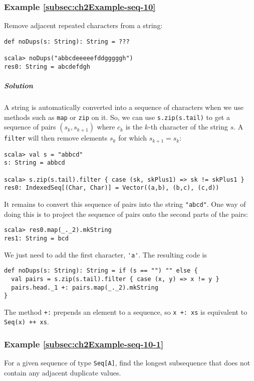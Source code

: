 \subsubsection{Example \label{subsec:ch2Example-seq-10}\ref{subsec:ch2Example-seq-10}}

Remove adjacent repeated characters from a string:
\begin{lstlisting}
def noDups(s: String): String = ???

scala> noDups("abbcdeeeeefddgggggh")
res0: String = abcdefdgh
\end{lstlisting}


\subparagraph{Solution}

A string is automatically converted into a sequence of characters
when we use methods such as \lstinline!map! or \lstinline!zip! on
it. So, we can use \lstinline!s.zip(s.tail)! to get a sequence of
pairs $\left(s_{k},s_{k+1}\right)$ where $c_{k}$ is the $k$-th
character of the string $s$. A \lstinline!filter! will then remove
elements $s_{k}$ for which $s_{k+1}=s_{k}$:
\begin{lstlisting}
scala> val s = "abbcd"
s: String = abbcd

scala> s.zip(s.tail).filter { case (sk, skPlus1) => sk != skPlus1 }
res0: IndexedSeq[(Char, Char)] = Vector((a,b), (b,c), (c,d))
\end{lstlisting}
It remains to convert this sequence of pairs into the string \lstinline!"abcd"!.
One way of doing this is to project the sequence of pairs onto the
second parts of the pairs:
\begin{lstlisting}
scala> res0.map(_._2).mkString
res1: String = bcd
\end{lstlisting}
We just need to add the first character, \lstinline!'a'!. The resulting
code is
\begin{lstlisting}
def noDups(s: String): String = if (s == "") "" else {
  val pairs = s.zip(s.tail).filter { case (x, y) => x != y }
  pairs.head._1 +: pairs.map(_._2).mkString
}
\end{lstlisting}
The method \lstinline!+:! prepends an element to a sequence, so \lstinline!x +: xs!
is equivalent to \lstinline!Seq(x) ++ xs!.

\subsubsection{Example \label{subsec:ch2Example-seq-10-1}\ref{subsec:ch2Example-seq-10-1}}

For a given sequence of type \lstinline!Seq[A]!, find the longest
subsequence that does not contain any adjacent duplicate values.

